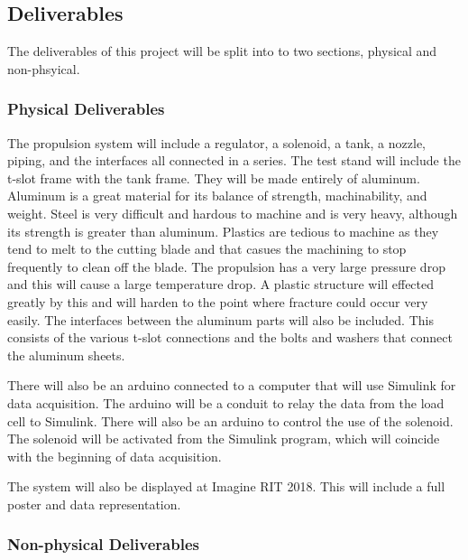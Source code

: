 \documentclass[conference]{IEEEtran} %
\begin{document}
\subsection{Deliverables}
\label{subsec:deliverables}
The deliverables of this project will be split into to two sections, physical and non-phsyical.

\subsubsection{Physical Deliverables}
\label{subsubsec: physical deliverables}

The propulsion system will include a regulator, a solenoid, a tank, a nozzle, piping, and the interfaces all connected in a series.
The test stand will include the t-slot frame with the tank frame. They will be made entirely of aluminum. Aluminum is a great material for its balance of strength, machinability, and
weight. Steel is very difficult and hardous to machine and is very heavy, although its strength is greater than aluminum. Plastics are tedious to machine as they tend to melt to the cutting
blade and that casues the machining to stop frequently to clean off the blade. The propulsion has a very large pressure drop and this will cause a large temperature drop. A plastic structure will
effected greatly by this and will harden to the point where fracture could occur very easily. The interfaces between the
aluminum parts will also be included. This consists of the various t-slot connections and the bolts and washers that connect the aluminum sheets.

There will also be an arduino connected to a computer that will use Simulink for data acquisition. The arduino will be a conduit to relay the data from the load cell
to Simulink. There will also be an arduino to control the use of the solenoid. The solenoid will be activated from the Simulink program, which will coincide with
the beginning of data acquisition.

The system will also be displayed at Imagine RIT 2018. This will include a full poster and data representation.

\subsubsection{Non-physical Deliverables}
\label{subsubsec: non-physical deliverables}
\end{document}
